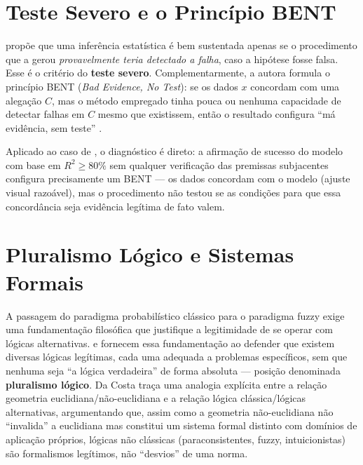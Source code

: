 \documentclass[
    12pt,
    oneside,
    openany,
    a4paper,
    english,
    brazil
]{abntex2}
\theoremstyle{definition}
\begin{document}
\section{Teste Severo e o Princípio BENT}
\label{sec:teste-severo}

 propõe que uma inferência estatística é bem sustentada apenas se o procedimento que a gerou \textit{provavelmente teria detectado a falha}, caso a hipótese fosse falsa. Esse é o critério do \textbf{teste severo}. Complementarmente, a autora formula o princípio BENT (\textit{Bad Evidence, No Test}): se os dados $x$ concordam com uma alegação $C$, mas o método empregado tinha pouca ou nenhuma capacidade de detectar falhas em $C$ mesmo que existissem, então o resultado configura ``má evidência, sem teste'' \cite[§1.1]{mayo2018statistical}.

Aplicado ao caso de , o diagnóstico é direto: a afirmação de sucesso do modelo com base em $R^2 \geq 80\%$ sem qualquer verificação das premissas subjacentes configura precisamente um BENT --- os dados concordam com o modelo (ajuste visual razoável), mas o procedimento não testou se as condições para que essa concordância seja evidência legítima de fato valem.

\section{Pluralismo Lógico e Sistemas Formais}
\label{sec:pluralismo}

A passagem do paradigma probabilístico clássico para o paradigma fuzzy exige uma fundamentação filosófica que justifique a legitimidade de se operar com lógicas alternativas.  e  fornecem essa fundamentação ao defender que existem diversas lógicas legítimas, cada uma adequada a problemas específicos, sem que nenhuma seja ``a lógica verdadeira'' de forma absoluta --- posição denominada \textbf{pluralismo lógico}. Da Costa traça uma analogia explícita entre a relação geometria euclidiana/não-euclidiana e a relação lógica clássica/lógicas alternativas, argumentando que, assim como a geometria não-euclidiana não ``invalida'' a euclidiana mas constitui um sistema formal distinto com domínios de aplicação próprios, lógicas não clássicas (paraconsistentes, fuzzy, intuicionistas) são formalismos legítimos, não ``desvios'' de uma norma.
\end{document}
